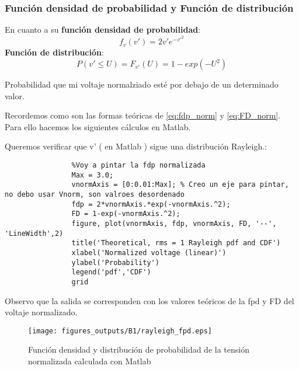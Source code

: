 \documentclass{article}
\begin{document}
        \subsubsection{Función densidad de probabilidad y Función de distribución}
            \par En cuanto a su \textbf{función densidad de probabilidad}:
            \begin{equation}
                \tag{función densidad de probabilidad normalizada}
                f_v(v') = 2v'e^{-v'^2}
                \label{eq:fdp_norm}
            \end{equation}
            \textbf{Función de distribución}:
            \begin{equation}
                \tag{Función de distribución normalizada}
                P(v'\leq U) = F_{v'}(U)=1-exp(-U^2)
                \label{eq:FD_norm}
            \end{equation}
            \par Probabilidad que mi voltaje normalziado esté por debajo de un determinado valor.
            \par Recordemos como son las formas teóricas de \ref{eq:fdp_norm} y \ref{eq:FD_norm}. Para ello hacemos los siguientes cálculos en Matlab.
            \par Queremos verificar que v' ( en Matlab  ) sigue una distribución Rayleigh.:
            \begin{lstlisting}
                %Voy a pintar la fdp normalizada
                Max = 3.0;
                vnormAxis = [0:0.01:Max]; % Creo un eje para pintar, no debo usar Vnorm, son valroes desordenado
                fdp = 2*vnormAxis.*exp(-vnormAxis.^2);
                FD = 1-exp(-vnormAxis.^2);
                figure, plot(vnormAxis, fdp, vnormAxis, FD, '--', 'LineWidth',2)
                title('Theoretical, rms = 1 Rayleigh pdf and CDF')
                xlabel('Normalized voltage (linear)')
                ylabel('Probability')
                legend('pdf','CDF')
                grid
            \end{lstlisting}  
            \par Observo que la salida se corresponden con los valores teóricos de la fpd y FD del voltaje normalizado.
            \begin{figure}[h]
                \centering
                \texttt{[image: figures\_outputs/B1/rayleigh\_fpd.eps]}
                \caption{Función densidad y distribución de probabilidad de la tensión normalizada calculada con Matlab}
                \label{fig:fdp_norm}
            \end{figure}
\end{document}
